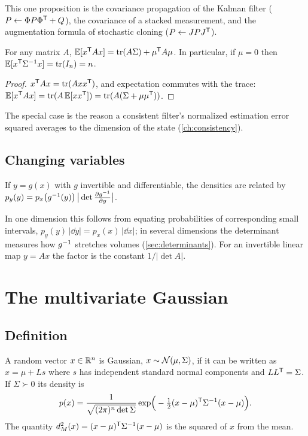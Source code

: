 This one proposition is the covariance propagation of the Kalman filter ($P \leftarrow \Phi P \Phi^{\mathsf{T}} + Q$), the covariance of a stacked
measurement, and the augmentation formula of stochastic cloning ($P \leftarrow JPJ^{\mathsf{T}}$).

\begin{proposition}
\label{prop:quadratic-expectation}
For any matrix $A$, $\mathbb{E}[x^{\mathsf{T}} Ax] = \operatorname{tr}(A\Sigma) + \mu^{\mathsf{T}} A\mu$. In particular, if $\mu = 0$ then $\mathbb{E}[x^{\mathsf{T}}\Sigma^{-1} x] = \operatorname{tr}(I_n) = n$.
\end{proposition}
\begin{proof}
$x^{\mathsf{T}} Ax = \operatorname{tr}(Axx^{\mathsf{T}})$, and expectation commutes with the trace: $\mathbb{E}[x^{\mathsf{T}} Ax] = \operatorname{tr}(A\,\mathbb{E}[xx^{\mathsf{T}}]) = \operatorname{tr}(A(\Sigma + \mu\mu^{\mathsf{T}}))$.
\end{proof}

The special case is the reason a consistent filter's normalized estimation error squared averages to the dimension of the state
(\cref{ch:consistency}).

\subsection{Changing variables}

\begin{proposition}
\label{prop:change-of-variables}
If $y = g(x)$ with $g$ invertible and differentiable, the densities are related by
$p_y(y) = p_x\big(g^{-1}(y)\big)\,\big|\det\frac{\partial g^{-1}}{\partial y}\big|$.
\end{proposition}

In one dimension this follows from equating probabilities of corresponding small intervals, $p_y(y)\,|\dd y| = p_x(x)\,|\dd x|$; in several
dimensions the determinant measures how $g^{-1}$ stretches volumes (\cref{sec:determinants}). For an invertible linear map $y = Ax$ the factor
is the constant $1/|\det A|$.

\section{The multivariate Gaussian}

\subsection{Definition}

\begin{definition}
A random vector $x \in \mathbb{R}^n$ is Gaussian, $x \sim \mathcal{N}(\mu, \Sigma)$, if it can be written as $x = \mu + Ls$ where $s$ has independent standard
normal components and $LL^{\mathsf{T}} = \Sigma$. If $\Sigma \succ 0$ its density is
\begin{equation}
  p(x) = \frac{1}{\sqrt{(2\pi)^n \det\Sigma}}\exp\!\Big( -\tfrac12 (x - \mu)^{\mathsf{T}} \Sigma^{-1} (x - \mu) \Big).
  \label{eq:gaussian-pdf}
\end{equation}
The quantity $d_M^2(x) = (x - \mu)^{\mathsf{T}}\Sigma^{-1}(x - \mu)$ is the squared  of $x$ from the mean.
\end{definition}

